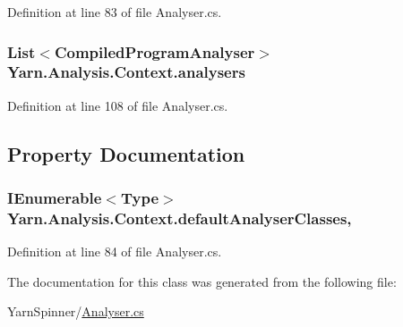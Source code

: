 Definition at line 83 of file Analyser.\-cs.

\hypertarget{a00047_aa5c7eaa90ad9c47969a3b336080d8991}{
\subsubsection[{analysers}]{\setlength{\rightskip}{0pt plus 5cm}List$<${\bf Compiled\-Program\-Analyser}$>$ Yarn.\-Analysis.\-Context.\-analysers\hspace{0.3cm}{\ttfamily [private]}}}\label{a00047_aa5c7eaa90ad9c47969a3b336080d8991}


Definition at line 108 of file Analyser.\-cs.



\subsection{Property Documentation}
\hypertarget{a00047_afdf24f2512251c2203ba1bde8f4a0f90}{
\subsubsection[{default\-Analyser\-Classes}]{\setlength{\rightskip}{0pt plus 5cm}I\-Enumerable$<$Type$>$ Yarn.\-Analysis.\-Context.\-default\-Analyser\-Classes\hspace{0.3cm}{\ttfamily [get]}, {\ttfamily [package]}}}\label{a00047_afdf24f2512251c2203ba1bde8f4a0f90}


Definition at line 84 of file Analyser.\-cs.



The documentation for this class was generated from the following file\-:\begin{DoxyCompactItemize}
\item 
Yarn\-Spinner/\hyperlink{a00287}{Analyser.\-cs}\end{DoxyCompactItemize}
